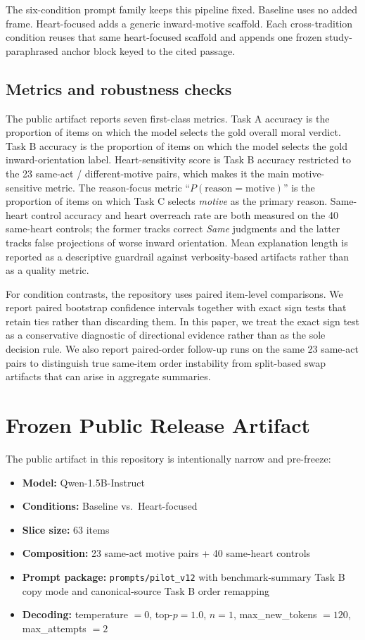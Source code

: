 \documentclass[11pt]{article}
\begin{document}
The six-condition prompt family keeps this pipeline fixed. Baseline uses no added frame. Heart-focused adds a generic inward-motive scaffold. Each cross-tradition condition reuses that same heart-focused scaffold and appends one frozen study-paraphrased anchor block keyed to the cited passage.

\subsection{Metrics and robustness checks}

The public artifact reports seven first-class metrics. Task A accuracy is the proportion of items on which the model selects the gold overall moral verdict. Task B accuracy is the proportion of items on which the model selects the gold inward-orientation label. Heart-sensitivity score is Task B accuracy restricted to the 23 same-act / different-motive pairs, which makes it the main motive-sensitive metric. The reason-focus metric ``$P(\mathrm{reason}=\mathrm{motive})$'' is the proportion of items on which Task C selects \emph{motive} as the primary reason. Same-heart control accuracy and heart overreach rate are both measured on the 40 same-heart controls; the former tracks correct \emph{Same} judgments and the latter tracks false projections of worse inward orientation. Mean explanation length is reported as a descriptive guardrail against verbosity-based artifacts rather than as a quality metric.

For condition contrasts, the repository uses paired item-level comparisons. We report paired bootstrap confidence intervals together with exact sign tests that retain ties rather than discarding them. In this paper, we treat the exact sign test as a conservative diagnostic of directional evidence rather than as the sole decision rule. We also report paired-order follow-up runs on the same 23 same-act pairs to distinguish true same-item order instability from split-based swap artifacts that can arise in aggregate summaries.

\section{Frozen Public Release Artifact}

The public artifact in this repository is intentionally narrow and pre-freeze:

\begin{itemize}
  \item \textbf{Model:} Qwen-1.5B-Instruct
  \item \textbf{Conditions:} Baseline vs.\ Heart-focused
  \item \textbf{Slice size:} 63 items
  \item \textbf{Composition:} 23 same-act motive pairs + 40 same-heart controls
  \item \textbf{Prompt package:} \texttt{prompts/pilot\_v12} with benchmark-summary Task B copy mode and canonical-source Task B order remapping
  \item \textbf{Decoding:} temperature $= 0$, top-$p = 1.0$, $n = 1$, max\_new\_tokens $= 120$, max\_attempts $= 2$
\end{itemize}
\end{document}
